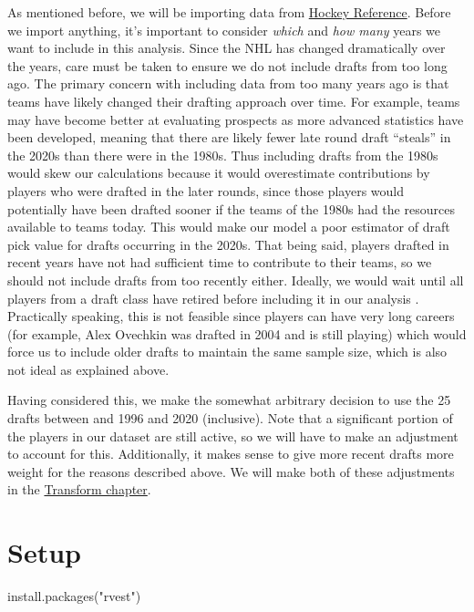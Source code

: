 \documentclass[
  letterpaper,
  DIV=11,
  numbers=noendperiod]{scrreprt}
\newenvironment{Shaded}{\begin{snugshade}}{\end{snugshade}}
\newcommand{\FunctionTok}[1]{\textcolor[rgb]{0.28,0.35,0.67}{#1}}
\newcommand{\NormalTok}[1]{\textcolor[rgb]{0.00,0.23,0.31}{#1}}
\newcommand{\StringTok}[1]{\textcolor[rgb]{0.13,0.47,0.30}{#1}}
\begin{document}
As mentioned before, we will be importing data from
\href{https://www.hockey-reference.com/draft}{Hockey Reference}. Before
we import anything, it's important to consider \emph{which} and
\emph{how many} years we want to include in this analysis. Since the NHL
has changed dramatically over the years, care must be taken to ensure we
do not include drafts from too long ago. The primary concern with
including data from too many years ago is that teams have likely changed
their drafting approach over time. For example, teams may have become
better at evaluating prospects as more advanced statistics have been
developed, meaning that there are likely fewer late round draft
``steals'' in the 2020s than there were in the 1980s. Thus including
drafts from the 1980s would skew our calculations because it would
overestimate contributions by players who were drafted in the later
rounds, since those players would potentially have been drafted sooner
if the teams of the 1980s had the resources available to teams today.
This would make our model a poor estimator of draft pick value for
drafts occurring in the 2020s. That being said, players drafted in
recent years have not had sufficient time to contribute to their teams,
so we should not include drafts from too recently either. Ideally, we
would wait until all players from a draft class have retired before
including it in our analysis . Practically speaking, this is not
feasible since players can have very long careers (for example, Alex
Ovechkin was drafted in 2004 and is still playing) which would force us
to include older drafts to maintain the same sample size, which is also
not ideal as explained above.

Having considered this, we make the somewhat arbitrary decision to use
the 25 drafts between and 1996 and 2020 (inclusive). Note that a
significant portion of the players in our dataset are still active, so
we will have to make an adjustment to account for this. Additionally, it
makes sense to give more recent drafts more weight for the reasons
described above. We will make both of these adjustments in the
\href{https://trevsteu.github.io/Stat468_Final/transform.html}{Transform
chapter}.


\chapter{Setup}\label{setup}

\begin{Shaded}
\begin{Highlighting}[]
\FunctionTok{install.packages}\NormalTok{(}\StringTok{"rvest"}\NormalTok{)}
\end{Highlighting}
\end{Shaded}
\end{document}

